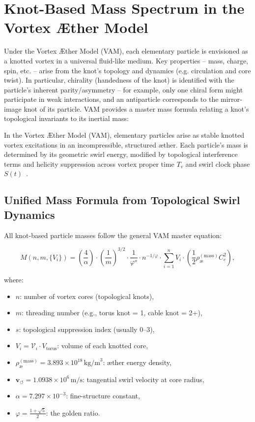 
\section{Knot-Based Mass Spectrum in the Vortex \AE{}ther Model}
\label{sec:knot_particle_mapping}

Under the Vortex Æther Model (VAM), each elementary particle is envisioned as a knotted vortex in a universal fluid-like medium. Key properties – mass, charge, spin, etc. – arise from the knot’s topology and dynamics (e.g. circulation and core twist). In particular, chirality (handedness of the knot) is identified with the particle’s inherent parity/asymmetry – for example, only one chiral form might participate in weak interactions, and an antiparticle corresponds to the mirror‐image knot of its particle. VAM provides a master mass formula relating a knot’s topological invariants to its inertial mass:

In the Vortex \AE{}ther Model (VAM), elementary particles arise as stable knotted vortex excitations in an incompressible, structured æther. Each particle's mass is determined by its geometric swirl energy, modified by topological interference terms and helicity suppression across vortex proper time \(T_v\) and swirl clock phase \(S(t)\)~\cite{Iskandarani2025StandardModel, Iskandarani2025Timedilation}.

\subsection{Unified Mass Formula from Topological Swirl Dynamics}

All knot-based particle masses follow the general VAM master equation:

\begin{equation}
M(n, m, \{V_i\}) = \left( \frac{4}{\alpha} \right) \cdot \left( \frac{1}{m} \right)^{3/2} \cdot \frac{1}{\varphi^s} \cdot n^{-1/\varphi} \cdot \sum_{i=1}^{n} V_i \cdot \left( \frac{1}{2} \rho_\text{\ae}^{(\text{mass})} C_e^2 \right),
\label{eq:mass_master}
\end{equation}

where:
\begin{itemize}
  \item \(n\): number of vortex cores (topological knots),
  \item \(m\): threading number (e.g., torus knot = 1, cable knot = 2+),
  \item \(s\): topological suppression index (usually 0–3),
  \item \(V_i = \mathcal{V}_i \cdot V_{\text{torus}}\): volume of each knotted core,
  \item \(\rho_\text{\ae}^{(\text{mass})} = 3.893 \times 10^{18}\,\text{kg/m}^3\): æther energy density,
  \item \(\mathbf{v}_{\scriptscriptstyle\boldsymbol{\circlearrowleft}} = 1.0938 \times 10^6\,\text{m/s}\): tangential swirl velocity at core radius,
  \item \(\alpha = 7.297\times 10^{-3}\): fine-structure constant,
  \item \(\varphi = \frac{1+\sqrt{5}}{2}\): the golden ratio.
\end{itemize}

